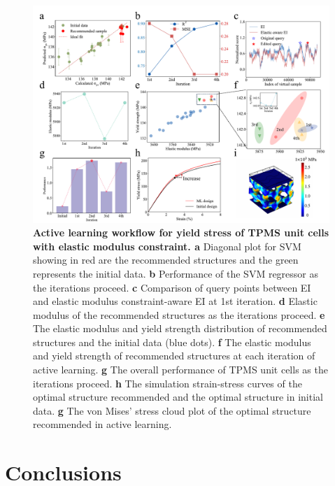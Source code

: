 \documentclass[preprint,review,12pt,authoryear]{elsarticle}
\begin{document}
\begin{figure}
    \centering
    \includegraphics[width=1\linewidth]{figures/7.pdf}
    \caption{\textbf{Active learning workflow for yield stress of TPMS unit cells with elastic modulus constraint. a} Diagonal plot for SVM showing in red are the recommended structures and the green represents the initial data. \textbf{b} Performance of the SVM regressor as the iterations proceed. \textbf{c} Comparison of query points between EI and elastic modulus constraint-aware EI at 1st iteration. \textbf{d} Elastic modulus of the recommended structures as the iterations proceed. \textbf{e} The elastic modulus and yield strength distribution of recommended structures and the initial data (blue dots). \textbf{f} The elastic modulus and yield strength of recommended structures at each iteration of active learning. \textbf{g} The overall performance of TPMS unit cells as the iterations proceed. \textbf{h} The simulation strain-stress curves of the optimal structure recommended and the optimal 
structure in initial data. \textbf{g} The von Mises' stress cloud plot of the optimal structure recommended in active learning.}
    \label{fig:7}
\end{figure}

\section{Conclusions}
\end{document}
